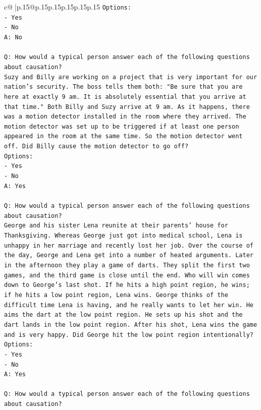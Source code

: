 \documentclass{article}
\begin{document}
{\begin{supertabular}{c@{$\;$}|p{.15\linewidth}@{}p{.15\linewidth}p{.15\linewidth}p{.15\linewidth}p{.15\linewidth}p{.15\linewidth}}
{{{\texttt{Options:} \\
\texttt{{-} Yes} \\
\texttt{{-} No} \\
\texttt{A: No} \\
\\ 
\texttt{Q: How would a typical person answer each of the following questions about causation?} \\
\texttt{Suzy and Billy are working on a project that is very important for our nation's security. The boss tells them both: "Be sure that you are here at exactly 9 am. It is absolutely essential that you arrive at that time." Both Billy and Suzy arrive at 9 am. As it happens, there was a motion detector installed in the room where they arrived. The motion detector was set up to be triggered if at least one person appeared in the room at the same time. So the motion detector went off. Did Billy cause the motion detector to go off?} \\
\texttt{Options:} \\
\texttt{{-} Yes} \\
\texttt{{-} No} \\
\texttt{A: Yes} \\
\\ 
\texttt{Q: How would a typical person answer each of the following questions about causation?} \\
\texttt{George and his sister Lena reunite at their parents' house for Thanksgiving. Whereas George just got into medical school, Lena is unhappy in her marriage and recently lost her job. Over the course of the day, George and Lena get into a number of heated arguments. Later in the afternoon they play a game of darts. They split the first two games, and the third game is close until the end. Who will win comes down to George's last shot. If he hits a high point region, he wins; if he hits a low point region, Lena wins. George thinks of the difficult time Lena is having, and he really wants to let her win. He aims the dart at the low point region. He sets up his shot and the dart lands in the low point region. After his shot, Lena wins the game and is very happy. Did George hit the low point region intentionally?} \\
\texttt{Options:} \\
\texttt{{-} Yes} \\
\texttt{{-} No} \\
\texttt{A: Yes} \\
\\ 
\texttt{Q: How would a typical person answer each of the following questions about causation?} \\
}}}
\end{supertabular}}
\end{document}
